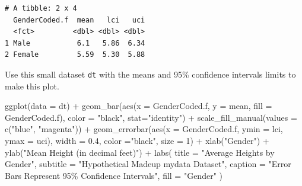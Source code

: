 \documentclass[
  letterpaper,
  DIV=11,
  numbers=noendperiod]{scrartcl}
\newenvironment{Shaded}{\begin{snugshade}}{\end{snugshade}}
\newcommand{\AttributeTok}[1]{\textcolor[rgb]{0.40,0.45,0.13}{#1}}
\newcommand{\DecValTok}[1]{\textcolor[rgb]{0.68,0.00,0.00}{#1}}
\newcommand{\FloatTok}[1]{\textcolor[rgb]{0.68,0.00,0.00}{#1}}
\newcommand{\FunctionTok}[1]{\textcolor[rgb]{0.28,0.35,0.67}{#1}}
\newcommand{\NormalTok}[1]{\textcolor[rgb]{0.00,0.23,0.31}{#1}}
\newcommand{\SpecialCharTok}[1]{\textcolor[rgb]{0.37,0.37,0.37}{#1}}
\newcommand{\StringTok}[1]{\textcolor[rgb]{0.13,0.47,0.30}{#1}}
\begin{document}
\begin{verbatim}
# A tibble: 2 x 4
  GenderCoded.f  mean   lci   uci
  <fct>         <dbl> <dbl> <dbl>
1 Male           6.1   5.86  6.34
2 Female         5.59  5.30  5.88
\end{verbatim}

\newpage

Use this small dataset \texttt{dt} with the means and 95\% confidence
intervals limits to make this plot.

\begin{Shaded}
\begin{Highlighting}[]
\FunctionTok{ggplot}\NormalTok{(}\AttributeTok{data =}\NormalTok{ dt) }\SpecialCharTok{+}
  \FunctionTok{geom\_bar}\NormalTok{(}\FunctionTok{aes}\NormalTok{(}\AttributeTok{x =}\NormalTok{ GenderCoded.f, }
               \AttributeTok{y =}\NormalTok{ mean, }
               \AttributeTok{fill =}\NormalTok{ GenderCoded.f), }
           \AttributeTok{color =} \StringTok{"black"}\NormalTok{,}
           \AttributeTok{stat=}\StringTok{"identity"}\NormalTok{) }\SpecialCharTok{+}
  \FunctionTok{scale\_fill\_manual}\NormalTok{(}\AttributeTok{values =} \FunctionTok{c}\NormalTok{(}\StringTok{"blue"}\NormalTok{, }
                               \StringTok{"magenta"}\NormalTok{)) }\SpecialCharTok{+} 
  \FunctionTok{geom\_errorbar}\NormalTok{(}\FunctionTok{aes}\NormalTok{(}\AttributeTok{x =}\NormalTok{ GenderCoded.f, }
                    \AttributeTok{ymin =}\NormalTok{ lci, }
                    \AttributeTok{ymax =}\NormalTok{ uci), }
                \AttributeTok{width =} \FloatTok{0.4}\NormalTok{, }
                \AttributeTok{color =}\StringTok{"black"}\NormalTok{, }
                \AttributeTok{size =} \DecValTok{1}\NormalTok{) }\SpecialCharTok{+}
  \FunctionTok{xlab}\NormalTok{(}\StringTok{"Gender"}\NormalTok{) }\SpecialCharTok{+}
  \FunctionTok{ylab}\NormalTok{(}\StringTok{"Mean Height (in decimal feet)"}\NormalTok{) }\SpecialCharTok{+}
  \FunctionTok{labs}\NormalTok{(}
    \AttributeTok{title =} \StringTok{"Average Heights by Gender"}\NormalTok{,}
    \AttributeTok{subtitle =} \StringTok{"Hypothetical Madeup mydata Dataset"}\NormalTok{,}
    \AttributeTok{caption =} \StringTok{"Error Bars Represent 95\% Confidence Intervals"}\NormalTok{,}
    \AttributeTok{fill =} \StringTok{"Gender"}
\NormalTok{  )}
\end{Highlighting}
\end{Shaded}
\end{document}
